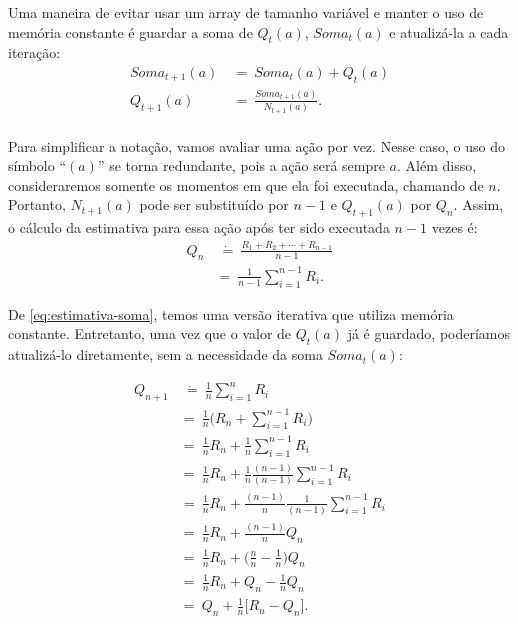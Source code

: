 \documentclass{article}
\begin{document}
        Uma maneira de evitar usar um array de tamanho variável e manter o uso de memória constante é guardar a soma de $Q_t(a)$, $Soma_t(a)$ e atualizá-la a cada iteração:
        \begin{equation}
        \label{eq:estimativa-soma}
        \begin{split}
            Soma_{t+1}(a) & \ = \ Soma_t(a) + Q_t(a) \\
            Q_{t+1}(a) & \ = \ \frac{Soma_{t+1}(a)}{N_{t+1}(a)} . \\
        \end{split}
        \end{equation}

        Para simplificar a notação, vamos avaliar uma ação por vez. Nesse caso, o uso do símbolo ``$(a)$'' se torna redundante, pois a ação será sempre $a$. Além disso, consideraremos somente os momentos em que ela foi executada, chamando de $n$. Portanto, $N_{t+1}(a)$ pode ser substituído por $n-1$ e $Q_{t+1}(a)$ por $Q_n$. Assim, o cálculo da estimativa para essa ação após ter sido executada $n-1$ vezes é:
        \begin{equation}
        \begin{split}
            Q_n & \ \dot{=} \ \frac{R_1 + R_2 + \cdots + R_{n-1}}{n - 1}\\
            & = \ \frac{1}{n-1} \sum_{i=1}^{n-1} R_i .
        \end{split}
        \end{equation}
        
        De \eqref{eq:estimativa-soma}, temos uma versão iterativa que utiliza memória constante. Entretanto, uma vez que o valor de $Q_t(a)$ já é guardado, poderíamos atualizá-lo diretamente, sem a necessidade da soma $Soma_t(a)$:
        
        \begin{subequations}
        \begin{align}
            Q_{n+1} & \ \dot{=} \ \frac{1}{n} \sum_{i=1}^{n} R_i\\
            & = \ \frac{1}{n} \Bigg( R_n + \sum_{i=1}^{n-1} R_i \Bigg) \nonumber\\
            & = \ \frac{1}{n} R_n + \frac{1}{n} \sum_{i=1}^{n-1} R_i \nonumber\\
            & = \ \frac{1}{n} R_n + \frac{1}{n} \frac{(n-1)}{(n-1)} \sum_{i=1}^{n-1} R_i \nonumber\\
            & = \ \frac{1}{n} R_n + \frac{(n-1)}{n} \frac{1}{(n-1)} \sum_{i=1}^{n-1} R_i \nonumber\\
            & = \ \frac{1}{n} R_n + \frac{(n-1)}{n} Q_n \nonumber\\
            & = \ \frac{1}{n} R_n + \Bigg( \frac{n}{n} - \frac{1}{n} \Bigg) Q_n \nonumber\\
            & = \ \frac{1}{n} R_n + Q_n - \frac{1}{n} Q_n \nonumber\\
            \label{eq:estimativa-qn}
            & = \ Q_n + \frac{1}{n} \Big[ R_n - Q_n \Big] .
        \end{align}
        \end{subequations}
        
\end{document}
